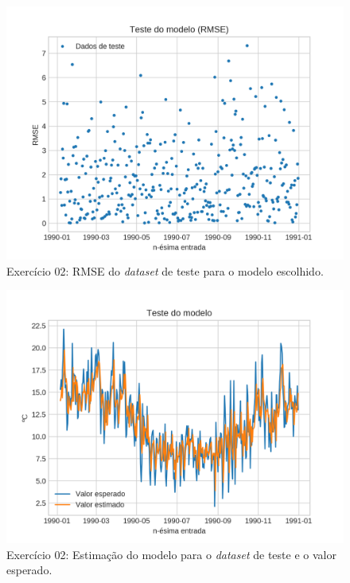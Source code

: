 \documentclass{article}
\begin{document}
    \begin{figure}[!h]
        \centering
        \includegraphics[width=\linewidth]{ex02/model_rmse.png}
        \caption{Exercício 02: RMSE do \textit{dataset} de teste para o modelo escolhido.}
        \label{fig:ex2_rmse}
    \end{figure}
    \begin{figure}[!h]
        \centering
        \includegraphics[width=\linewidth]{ex02/model_test.png}
        \caption{Exercício 02: Estimação do modelo para o \textit{dataset} de teste e o valor esperado.}
        \label{fig:ex2_comp}
    \end{figure}
\end{document}

